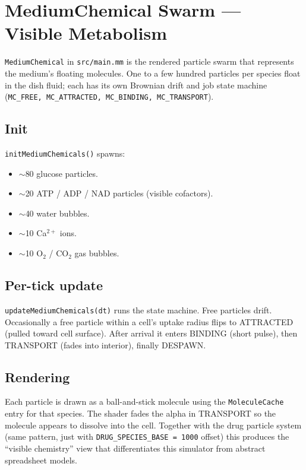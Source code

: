 \documentclass[11pt,letterpaper,twoside,openany]{book}
\newcommand{\code}[1]{\texttt{#1}}
\newcommand{\file}[1]{\texttt{\small#1}}
\begin{document}
\chapter{MediumChemical Swarm --- Visible Metabolism}
\label{ch:mediumchem-deep}

\code{MediumChemical} in \file{src/main.mm} is the rendered particle
swarm that represents the medium's floating molecules. One to a few
hundred particles per species float in the dish fluid; each has its
own Brownian drift and job state machine
(\code{MC\_FREE, MC\_ATTRACTED, MC\_BINDING, MC\_TRANSPORT}).

\section{Init}

\code{initMediumChemicals()} spawns:
\begin{itemize}
  \item $\sim$80 glucose particles.
  \item $\sim$20 ATP / ADP / NAD particles (visible cofactors).
  \item $\sim$40 water bubbles.
  \item $\sim$10 Ca$^{2+}$ ions.
  \item $\sim$10 O$_2$ / CO$_2$ gas bubbles.
\end{itemize}

\section{Per-tick update}

\code{updateMediumChemicals(dt)} runs the state machine. Free
particles drift. Occasionally a free particle within a cell's
uptake radius flips to ATTRACTED (pulled toward cell surface).
After arrival it enters BINDING (short pulse), then TRANSPORT
(fades into interior), finally DESPAWN.

\section{Rendering}

Each particle is drawn as a ball-and-stick molecule using the
\code{MoleculeCache} entry for that species. The shader fades the
alpha in TRANSPORT so the molecule appears to dissolve into the
cell. Together with the drug particle system (same pattern, just
with \code{DRUG\_SPECIES\_BASE = 1000} offset) this produces the
``visible chemistry'' view that differentiates this simulator from
abstract spreadsheet models.
\end{document}
